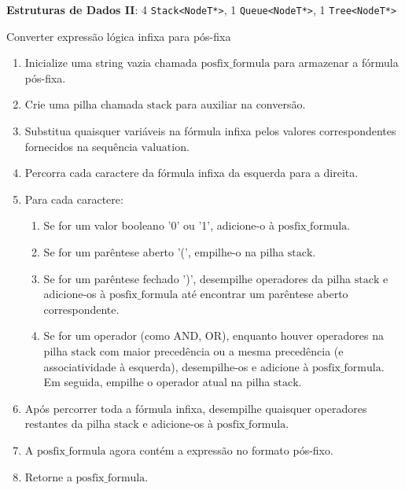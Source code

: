 \documentclass{article}
\begin{document}
\textbf{Estruturas de Dados II}: 4 \texttt{Stack\textless NodeT*\textgreater}, 1 \texttt{Queue\textless NodeT*\textgreater}, 1 \texttt{Tree<NodeT*>}


\begin{adjustwidth}{1em}{1em}
\begin{algorithm}
\caption{Converter expressão lógica infixa para pós-fixa}
\begin{enumerate}
    \item Inicialize uma string vazia chamada $\text{{posfix\_formula}}$ para armazenar a fórmula pós-fixa.
    \item Crie uma pilha chamada $\text{{stack}}$ para auxiliar na conversão.
    \item Substitua quaisquer variáveis na fórmula infixa pelos valores correspondentes fornecidos na sequência $\text{{valuation}}$.
    \item Percorra cada caractere da fórmula infixa da esquerda para a direita.
    \item Para cada caractere:
    \begin{enumerate}
        \item Se for um valor booleano '0' ou '1', adicione-o à $\text{{posfix\_formula}}$.
        \item Se for um parêntese aberto '(', empilhe-o na pilha $\text{{stack}}$.
        \item Se for um parêntese fechado ')', desempilhe operadores da pilha $\text{{stack}}$ e adicione-os à $\text{{posfix\_formula}}$ até encontrar um parêntese aberto correspondente.
        \item Se for um operador (como AND, OR), enquanto houver operadores na pilha $\text{{stack}}$ com maior precedência ou a mesma precedência (e associatividade à esquerda), desempilhe-os e adicione à $\text{{posfix\_formula}}$. Em seguida, empilhe o operador atual na pilha $\text{{stack}}$.
    \end{enumerate}
    \item Após percorrer toda a fórmula infixa, desempilhe quaisquer operadores restantes da pilha $\text{{stack}}$ e adicione-os à $\text{{posfix\_formula}}$.
    \item A $\text{{posfix\_formula}}$ agora contém a expressão no formato pós-fixo.
    \item Retorne a $\text{{posfix\_formula}}$.
\end{enumerate}
\end{algorithm}



\end{adjustwidth}
\end{document}
